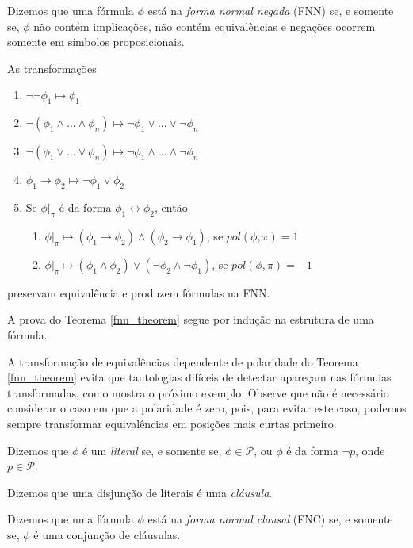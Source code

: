 \begin{definition}
    Dizemos que uma fórmula $\phi$ está na \emph{forma normal negada} (FNN) se, e somente se, $\phi$ não contém implicações, não contém equivalências e negações ocorrem somente em símbolos proposicionais.
\end{definition}

\begin{theorem}
    \label{fnn_theorem}
    As transformações
    \begin{enumerate}
        \item $\neg \neg \phi_1 \longmapsto \phi_1$
        \item $\neg(\phi_1 \wedge ... \wedge \phi_n) \longmapsto \neg \phi_1 \vee ... \vee \neg \phi_n$
        \item $\neg(\phi_1 \vee ... \vee \phi_n) \longmapsto \neg \phi_1 \wedge ... \wedge \neg \phi_n$
        \item $\phi_1 \rightarrow \phi_2 \longmapsto \neg \phi_1 \vee \phi_2$
        \item Se $\phi|_\pi$ é da forma $\phi_1 \leftrightarrow \phi_2$, então
        \begin{enumerate}
        	\item $\phi|_\pi \longmapsto (\phi_1 \rightarrow \phi_2) \wedge (\phi_2 \rightarrow \phi_1)$, se $pol(\phi,\pi) = 1$
        	\item $\phi|_\pi \longmapsto (\phi_1 \wedge \phi_2) \vee (\neg \phi_2 \wedge \neg \phi_1)$, se $pol(\phi,\pi) = -1$
        \end{enumerate}
    \end{enumerate}
    preservam equivalência e produzem fórmulas na FNN.
\end{theorem}

A prova do Teorema \ref{fnn_theorem} segue por indução na estrutura de uma fórmula.

A transformação de equivalências dependente de polaridade do Teorema \ref{fnn_theorem} evita que tautologias difíceis de detectar apareçam nas fórmulas transformadas, como mostra o próximo exemplo. Observe que não é necessário considerar o caso em que a polaridade é zero, pois, para evitar este caso, podemos sempre transformar equivalências em posições mais curtas primeiro.

\begin{definition}
	Dizemos que $\phi$ é um \emph{literal} se, e somente se, $\phi \in \mathcal{P}$, ou $\phi$ é da forma $\neg p$, onde $p \in \mathcal{P}$.
	
	Dizemos que uma disjunção de literais é uma \emph{cláusula}.
	
    Dizemos que uma fórmula $\phi$ está na \emph{forma normal clausal} (FNC) se, e somente se, $\phi$ é uma conjunção de cláusulas.
\end{definition}


